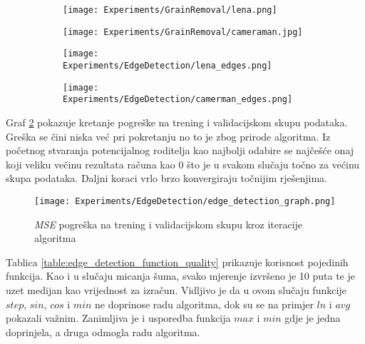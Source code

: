 \begin{figure}
	\centering
	\caption{Fotografije Lene i Kamermana prije i nakon detekcije rubova}
	\begin{subfigure}[t]{0.48\textwidth}
		\texttt{[image: Experiments/GrainRemoval/lena.png]}
	\end{subfigure}
	\begin{subfigure}[t]{0.48\textwidth}
		\texttt{[image: Experiments/GrainRemoval/cameraman.jpg]}
	\end{subfigure}
	\begin{subfigure}[t]{0.48\textwidth}
		\texttt{[image: Experiments/EdgeDetection/lena\_edges.png]}
	\end{subfigure}
	\begin{subfigure}[t]{0.48\textwidth}
		\texttt{[image: Experiments/EdgeDetection/camerman\_edges.png]}
	\end{subfigure}
	\label{fig:edge_detection_results}
\end{figure}

Graf \ref{fig:edge_detection_graph} pokazuje kretanje pogreške na trening i validacijskom skupu podataka.
Greška se čini niska već pri pokretanju no to je zbog prirode algoritma.
Iz početnog stvaranja potencijalnog roditelja kao najbolji odabire se najčešće onaj koji veliku večinu rezultata računa kao $0$ što je u svakom slučaju točno za većinu skupa podataka.
Daljni koraci vrlo brzo konvergiraju točnijim rješenjima.

\begin{figure}
	\centering
	\caption{\emph{MSE} pogreška na trening i validacijskom skupu kroz iteracije algoritma}
	\texttt{[image: Experiments/EdgeDetection/edge\_detection\_graph.png]}
	\label{fig:edge_detection_graph}
\end{figure}

Tablica \ref{table:edge_detection_function_quality} prikazuje korisnost pojedinih funkcija.
Kao i u slučaju micanja šuma, svako mjerenje izvršeno je 10 puta te je uzet medijan kao vrijednost za izračun.
Vidljivo je da u ovom slučaju funkcije $step$, $sin$, $cos$ i $min$ ne doprinose radu algoritma, dok su se na primjer $ln$ i $avg$ pokazali važnim.
Zanimljiva je i usporedba funkcija $max$ i $min$ gdje je jedna doprinjela, a druga odmogla radu algoritma.


